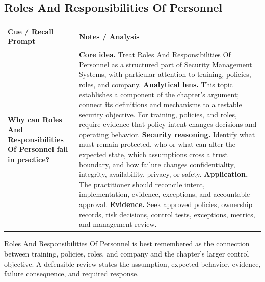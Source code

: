 \documentclass[11pt]{article}
\newcommand{\CornellHeader}{%
\rowcolor{Navy}\color{white}\bfseries Cue / Recall Prompt & \color{white}\bfseries Notes / Analysis\\\hline}
\newcommand{\CornellRow}[2]{%
\cellcolor{CueGray}\RaggedRight\textbf{#1} & \RaggedRight #2\\\hline}
\begin{document}
\subsection*{Roles And Responsibilities Of Personnel}
\begin{longtable}{>{\RaggedRight\arraybackslash}p{}|>{\RaggedRight\arraybackslash}p{}}
\CornellHeader
\CornellRow{Why can Roles And Responsibilities Of Personnel fail in practice?}{\textbf{Core idea.} Treat Roles And Responsibilities Of Personnel as a structured part of Security Management Systems, with particular attention to training, policies, roles, and company. \textbf{Analytical lens.} This topic establishes a component of the chapter's argument; connect its definitions and mechanisms to a testable security objective. For training, policies, and roles, require evidence that policy intent changes decisions and operating behavior. \textbf{Security reasoning.} Identify what must remain protected, who or what can alter the expected state, which assumptions cross a trust boundary, and how failure changes confidentiality, integrity, availability, privacy, or safety. \textbf{Application.} The practitioner should reconcile intent, implementation, evidence, exceptions, and accountable approval. \textbf{Evidence.} Seek approved policies, ownership records, risk decisions, control tests, exceptions, metrics, and management review.}
\end{longtable}
\begin{topicsummary}
Roles And Responsibilities Of Personnel is best remembered as the connection between training, policies, roles, and company and the chapter's larger control objective. A defensible review states the assumption, expected behavior, evidence, failure consequence, and required response.
\end{topicsummary}
\end{document}

